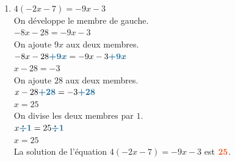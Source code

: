 \documentclass[a4paper,11pt]{article}
\begin{document}
\begin{seance}{}
\begin{enumerate}
\item $4(-2x-7)=-9x-3$\\On développe le membre de gauche.\\$-8x-28=-9x-3$\\On ajoute $9x$ aux deux membres.\\$-8x-28{\color[HTML]{216D9A}\boldsymbol{+9x}}=-9x-3{\color[HTML]{216D9A}\boldsymbol{+9x}}$\\$x-28=-3$\\On ajoute $28$ aux deux membres.\\$x-28{\color[HTML]{216D9A}\boldsymbol{+28}}=-3{\color[HTML]{216D9A}\boldsymbol{+28}}$\\$x=25$\\On divise les deux membres par $1$.\\$x{\color[HTML]{216D9A}\boldsymbol{\div1}}=25{\color[HTML]{216D9A}\boldsymbol{\div1}}$\\$x=25$\\La solution de l'équation $4(-2x-7)=-9x-3$ est ${\color[HTML]{f15929}\boldsymbol{25}}$.

\end{enumerate}
\end{seance}
\end{document}
